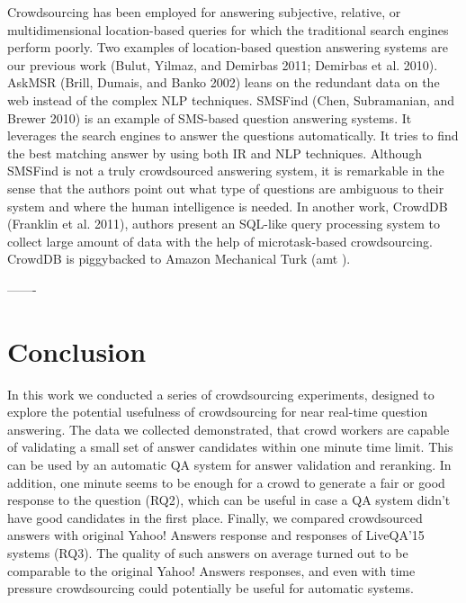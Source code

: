\documentclass[11pt,letterpaper]{article}
\begin{document}
Crowdsourcing has been employed for answering subjective,
relative, or multidimensional location-based queries
for which the traditional search engines perform poorly.
Two examples of location-based question answering systems
are our previous work (Bulut, Yilmaz, and Demirbas 2011;
Demirbas et al. 2010). AskMSR (Brill, Dumais, and Banko
2002) leans on the redundant data on the web instead of the
complex NLP techniques. SMSFind (Chen, Subramanian,
and Brewer 2010) is an example of SMS-based question answering
systems. It leverages the search engines to answer
the questions automatically. It tries to find the best matching
answer by using both IR and NLP techniques. Although
SMSFind is not a truly crowdsourced answering system, it is
remarkable in the sense that the authors point out what type
of questions are ambiguous to their system and where the
human intelligence is needed. In another work, CrowdDB
(Franklin et al. 2011), authors present an SQL-like query processing
system to collect large amount of data with the help
of microtask-based crowdsourcing. CrowdDB is piggybacked
to Amazon Mechanical Turk (amt ).

-------



\section{Conclusion}
\label{sec:conclusion}

In this work we conducted a series of crowdsourcing experiments, designed to explore the potential usefulness of crowdsourcing for near real-time question answering.
The data we collected demonstrated, that crowd workers are capable of validating a small set of answer candidates within one minute time limit.
This can be used by an automatic QA system for answer validation and reranking.
In addition, one minute seems to be enough for a crowd to generate a fair or good response to the question (RQ2), which can be useful in case a QA system didn't have good candidates in the first place.
Finally, we compared crowdsourced answers with original Yahoo! Answers response and responses of LiveQA'15 systems (RQ3).
The quality of such answers on average turned out to be comparable to the original Yahoo! Answers responses, and even with time pressure crowdsourcing could potentially be useful for automatic systems.




\end{document}
